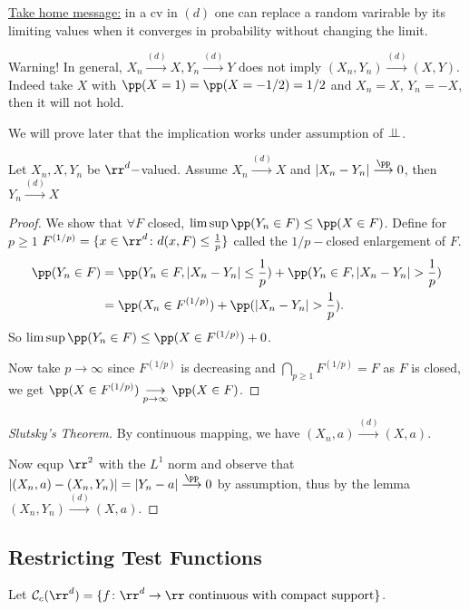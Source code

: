 \documentclass[../main.tex]{subfiles}
\begin{document}
\underline{\sffamily Take home message:} in a cv in $(d)$ one can replace a
random varirable by its limiting values when it converges in probability without
changing the limit.

{\color{red} Warning!} In general, $X_n \overset{(d)}{\longrightarrow} X, Y_n
\overset{(d)}{\longrightarrow} Y$ does not imply $(X_n, Y_n)
\overset{(d)}{\longrightarrow} (X, Y)$. Indeed take $X$ with $\pp(X = 1) = \pp(X
= -1/2) = 1/2$ and $X_n = X$, $Y_n = -X$, then it will not hold.

We will prove later that the implication works under assumption of $\perp\!\!\!\!\,\perp$.

\begin{lemma}
  Let $X_n, X, Y_n$ be $\rr^d-$valued. Assume $X_n
  \overset{(d)}{\longrightarrow} X$ and $|X_n - Y_n|
  \overset{\pp}{\longrightarrow} 0$, then $Y_n \overset{(d)}{\longrightarrow} X$
\end{lemma}
\begin{proof}
  We show that $\forall F$ closed, $\limsup \pp(Y_n \in F) \leq \pp(X \in F)$.
  Define for $p \geq 1$ $F^{(1/p)} = \{ x \in \rr^d \colon d(x, F) \leq
  \frac{1}{p}  \} $ called the $1/p-$closed enlargement of $F$.
  \begin{align*}
    \pp(Y_n \in F) &= \pp(Y_n \in F, |X_n - Y_n| \leq \frac{1}{p} ) + 
    \pp(Y_n \in F, |X_n - Y_n| > \frac{1}{p} )  \\
    &= \pp(X_n \in F^{(1/p)}) + \pp(|X_n - Y_n| > \frac{1}{p}).
  \end{align*}
  So $\limsup \pp(Y_n \in F) \leq \pp(X \in F^{(1/p)}) + 0$. 

  Now take $p \to \infty$ since $F^{(1/p)}$ is decreasing and $\bigcap_{p \geq
  1} F^{(1/p)} = F$ as $F$ is closed, we get $\pp(X \in F^{(1/p)}) \underset{p
  \to \infty}{\longrightarrow} \pp(X \in F)$.
\end{proof}
\begin{proof}
  [Slutsky's Theorem]
  By continuous mapping, we have $(X_n, a) \overset{(d)}{\longrightarrow} (X,
  a)$. 

  Now equp $\rr^2$ with the $L^1$ norm and observe that $|(X_n, a) - (X_n, Y_n)|
  = |Y_n- a| \overset{\pp}{\longrightarrow} 0$ by assumption, thus by the lemma
  $(X_n, Y_n) \overset{(d)}{\longrightarrow} (X, a)$.
\end{proof}

\subsection{Restricting Test Functions}
Let $\mathcal{C}_c(\rr^d) = \{ f \colon \rr^d \to \rr \text{ continuous with
compact support} \} $.
\end{document}
